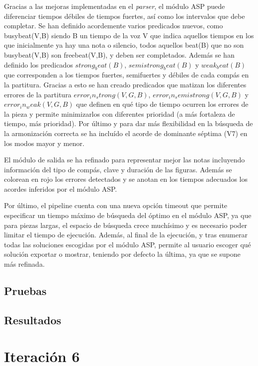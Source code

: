Gracias a las mejoras implementadas en el \textit{parser}, el módulo ASP puede diferenciar tiempos débiles de tiempos fuertes, así como los intervalos que debe completar. Se han definido acordemente varios predicados nuevos, como busybeat(V,B) siendo B un tiempo de la voz V que indica aquellos tiempos en los que inicialmente ya hay una nota o silencio, todos aquellos beat(B) que no son busybeat(V,B) son freebeat(V,B), y deben ser completados. Además se han definido los predicados $strong_beat(B)$, $semistrong_beat(B)$ y $weak_beat(B)$ que corresponden a los tiempos fuertes, semifuertes y débiles de cada compás en la partitura. Gracias a esto se han creado predicados que matizan los diferentes errores de la partitura $error_in_strong(V,G,B)$, $error_in_semistrong(V,G,B)$ y $error_in_weak(V,G,B)$ que definen en qué tipo de tiempo ocurren los errores de la pieza y permite minimizarlos con diferentes prioridad (a más fortaleza de tiempo, más prioridad). Por último y para dar más flexibilidad en la búsqueda de la armonización correcta se ha incluído el acorde de dominante séptima (V7) en los modos mayor y menor.

El módulo de salida se ha refinado para representar mejor las notas incluyendo información del tipo de compás, clave y duración de las figuras. Además se colorean en rojo los errores detectados y se anotan en los tiempos adecuados los acordes inferidos por el módulo ASP.

Por último, el pipeline cuenta con una nueva opción timeout que permite especificar un tiempo máximo de búsqueda del óptimo en el módulo ASP, ya que para piezas largas, el espacio de búsqueda crece muchísimo y es necesario poder limitar el tiempo de ejecución. Además, al final de la ejecución, y tras enumerar todas las soluciones escogidas por el módulo ASP, permite al usuario escoger qué solución exportar o mostrar, teniendo por defecto la última, ya que se supone más refinada.

\subsection{Pruebas}

\subsection{Resultados}

\section{Iteración 6}
